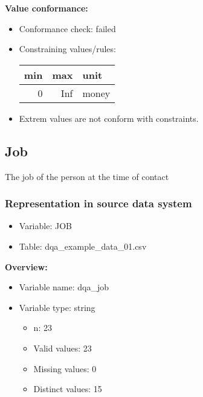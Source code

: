 \documentclass[
]{article}
\providecommand{\tightlist}{%
  \setlength{\itemsep}{0pt}\setlength{\parskip}{0pt}}
\begin{document}
\textbf{Value conformance:}

\begin{itemize}
\tightlist
\item
  Conformance check: failed
\item
  Constraining values/rules:

  \begin{table}[H]
  \centering
  \begin{tabular}{r|r|l}
  \hline
  \textbf{min} & \textbf{max} & \textbf{unit}\\
  \hline
  0 & Inf & money\\
  \hline
  \end{tabular}
  \end{table}
\item
  Extrem values are not conform with constraints.
\end{itemize}

\newpage

\hypertarget{job}{%
\subsection{Job}\label{job}}

The job of the person at the time of contact

\hypertarget{representation-in-source-data-system-8}{%
\subsubsection{\texorpdfstring{Representation in \textbf{source} data
system}{Representation in source data system}}\label{representation-in-source-data-system-8}}

\begin{itemize}
\tightlist
\item
  Variable: JOB
\item
  Table: dqa\_example\_data\_01.csv
\end{itemize}

\textbf{Overview:}

\begin{itemize}
\tightlist
\item
  Variable name: dqa\_job
\item
  Variable type: string

  \begin{itemize}
  \tightlist
  \item
    n: 23
  \item
    Valid values: 23
  \item
    Missing values: 0
  \item
    Distinct values: 15
  \end{itemize}
\end{itemize}
\end{document}
